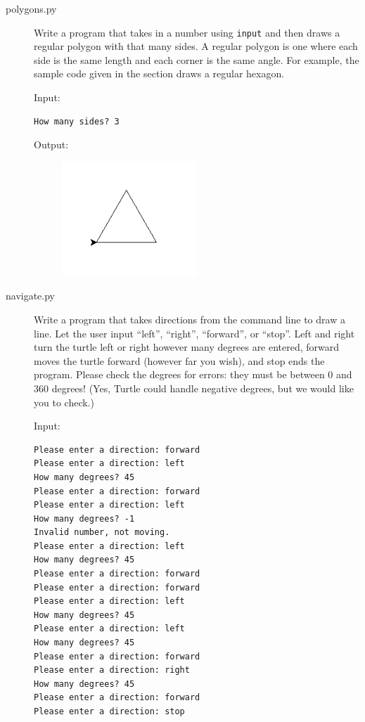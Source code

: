 \documentclass[11pt]{cselabheader}
\begin{document}
\begin{description}
  \item[polygons.py] Write a program that takes in a number using
    \lstinline{input} and then draws a regular polygon with that many sides. A
    regular polygon is one where each side is the same length and each corner is
    the same angle. For example, the sample code given in the section draws a
    regular hexagon.

    Input:
    \begin{lstlisting}[style=ipython]
How many sides? 3
    \end{lstlisting}

    Output:
    \begin{figure}[h]
      \centering
      \vspace{-10mm}
      \includegraphics[width=2.0in]{img/triangle}
    \vspace{-10mm}
    \end{figure}

  \item[navigate.py] Write a program that takes directions from the command line
    to draw a line. Let the user input ``left'', ``right'', ``forward'', or
    ``stop''. Left and right turn the turtle left or right however many degrees
    are entered, forward moves the turtle forward (however far you wish), and
    stop ends the program. Please check the degrees for errors: they must be
    between 0 and 360 degrees! (Yes, Turtle could handle negative degrees, but
    we would like you to check.)

    Input:
  \begin{lstlisting}[style=bash]
Please enter a direction: forward
Please enter a direction: left
How many degrees? 45
Please enter a direction: forward
Please enter a direction: left
How many degrees? -1
Invalid number, not moving.
Please enter a direction: left
How many degrees? 45
Please enter a direction: forward
Please enter a direction: forward
Please enter a direction: left
How many degrees? 45
Please enter a direction: left
How many degrees? 45
Please enter a direction: forward
Please enter a direction: right
How many degrees? 45
Please enter a direction: forward
Please enter a direction: stop
  \end{lstlisting}


\end{description}
\end{document}
